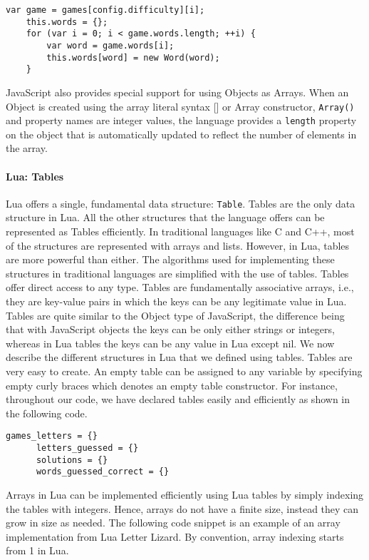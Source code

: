 \begin{lstlisting}[caption=A user-defined object demonstrating dynamic properties]
	var game = games[config.difficulty][i];
	this.words = {};
	for (var i = 0; i < game.words.length; ++i) {
		var word = game.words[i];
		this.words[word] = new Word(word);
	}
\end{lstlisting}

JavaScript also provides special support for using Objects as Arrays. When an Object 
is created using the array literal syntax [] or Array constructor, \texttt{Array()}
and property names are integer values, the language provides a \texttt{length} property
on the object that is automatically updated to reflect the number of elements in the array.

\paragraph{Lua: Tables}

Lua offers a single, fundamental data structure: \texttt{Table}. Tables are the only data structure in Lua. All the other structures that the language offers can be represented as Tables efficiently. In traditional languages like C and C++, most of the structures are represented with arrays and lists. However, in Lua, tables are more powerful than either. The algorithms used for implementing these structures in traditional languages are simplified with the use of tables. Tables offer direct access to any type. Tables are fundamentally associative arrays, i.e., they are key-value pairs in which the keys can be any legitimate value in Lua. Tables are quite similar to the Object type of JavaScript, the difference being that with JavaScript objects the keys can be only either strings or integers, whereas in Lua tables the keys can be any value in Lua except nil. We now describe the different structures in Lua that we defined using tables.
Tables are very easy to create. An empty table can be assigned to any variable by specifying empty curly braces which denotes an empty table constructor. For instance, throughout our code, we have declared tables easily and efficiently as shown in the following code.

\begin{lstlisting}[language={[5.2]Lua},caption=Declaring tables in Letter lizard]
	  games_letters = {}
	  letters_guessed = {}
	  solutions = {}
	  words_guessed_correct = {}
\end{lstlisting}

Arrays in Lua can be implemented efficiently using Lua tables by simply indexing the tables with integers. Hence, arrays do not have a finite size, instead they can grow in size as needed. The following code snippet is an example of an array implementation from Lua Letter Lizard. By convention, array indexing starts from 1 in Lua.

